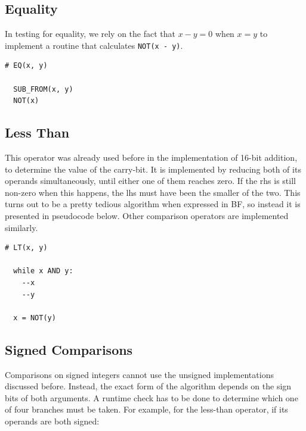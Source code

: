 \subsection{Equality}
\label{sec:compilation:equality}
In testing for equality, we rely on the fact that $x-y=0$ when $x=y$ to implement a routine that calculates \texttt{NOT(x - y)}.

\vspace{0.5cm}\noindent\begin{minipage}{\linewidth}
\begin{lstlisting}[style=brainfuck]
  # EQ(x, y)
  
  SUB_FROM(x, y)
  NOT(x)
\end{lstlisting}
\end{minipage}

\subsection{Less Than}
\label{sec:compilation:less}
This operator was already used before in the implementation of 16-bit addition, to determine the value of the carry-bit. It is implemented by reducing both of its operands simultaneously, until either one of them reaches zero. If the rhs is still non-zero when this happens, the lhs must have been the smaller of the two. This turns out to be a pretty tedious algorithm when expressed in BF, so instead it is presented in pseudocode below. Other comparison operators are implemented similarly.

\vspace{0.5cm}\noindent\begin{minipage}{\linewidth}
\begin{lstlisting}[style=pseudocode]
  # LT(x, y)

  while x AND y:
    --x
    --y

  x = NOT(y)
\end{lstlisting}
\end{minipage}

\subsection{Signed Comparisons}
\label{sec:compilation:signedcomparisons}
Comparisons on signed integers cannot use the unsigned implementations discussed before. Instead, the exact form of the algorithm depends on the sign bits of both arguments. A runtime check has to be done to determine which one of four branches must be taken. For example, for the less-than operator, if its operands are both signed:

